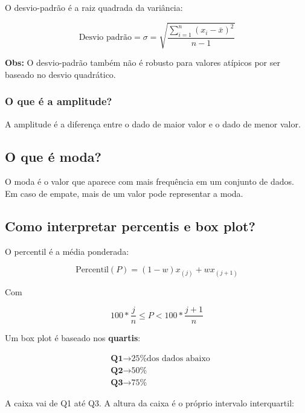 \documentclass{article}
\begin{document}
O desvio-padrão é a raiz quadrada da variância:

\begin{equation}
    \text{Desvio padrão} = \sigma = \sqrt{\frac{\displaystyle \sum_{i = 1}^{n} (x_{i} - \bar{x})^{2}}{n - 1}}
\end{equation}

\textbf{Obs:} O desvio-padrão também não é robusto para valores atípicos por ser baseado no desvio quadrático.

\subsubsection{O que é a amplitude?}

A amplitude é a diferença entre o dado de maior valor e o dado de menor valor.

\subsection{O que é moda?}

O moda é o valor que aparece com mais frequência em um conjunto de dados. Em caso de empate, mais de um valor pode representar a moda.

\subsection{Como interpretar percentis e box plot?}

O percentil é a média ponderada:

\begin{equation}
    \text{Percentil}(P) = (1 - w)x_{(j)} + wx_{(j+1)}
\end{equation}

Com

\begin{equation}
    100 * \frac{j}{n} \leq P < 100 * \frac{j + 1}{n}
\end{equation}

Um box plot é baseado nos \textbf{quartis}:

\begin{align*}
    &\textbf{Q1} \rightarrow \text{25\% dos dados abaixo} \\
    &\textbf{Q2} \rightarrow \text{50\%} \\
    &\textbf{Q3} \rightarrow \text{75\%}
\end{align*}

A caixa vai de Q1 até Q3. A altura da caixa é o próprio intervalo interquartil:
\end{document}
